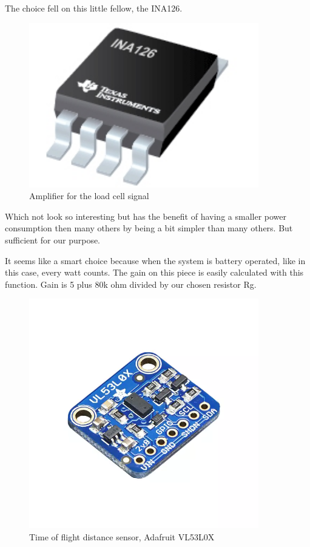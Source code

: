 The choice fell on this little fellow, the INA126. 

\begin{figure}[H]
\begin{center}
	\includegraphics[width = 10cm]{Figures/INA126.png}
	\caption{Amplifier for the load cell signal}
	\label{INA126}
\end{center}
\end{figure}


Which not look so interesting but has the benefit of having a smaller power consumption then many others by being a bit simpler than many others. But sufficient for our purpose.

It seems like a smart choice because when the system is battery operated, like in this case, every watt counts.
The gain on this piece is easily calculated with this function. Gain is 5 plus 80k ohm divided by our chosen resistor Rg.

 \begin{figure}[H]
\begin{center}
	\includegraphics[width = 10cm]{Figures/Adafruit_height_sensor.png}
	\caption{Time of flight distance sensor, Adafruit VL53L0X}
	\label{micro_lidar}
\end{center}
\end{figure}


